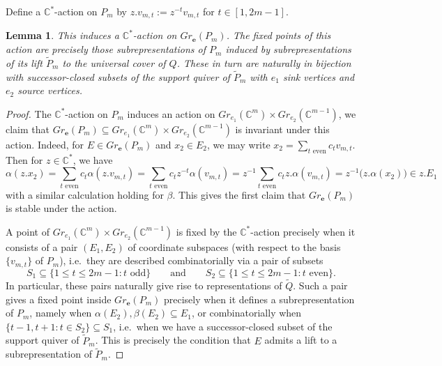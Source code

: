 \documentclass{amsart}
\newtheorem{lemma}[theorem]{Lemma}
\numberwithin{equation}{section}
\newcommand{\CC}{\mathbb{C}}
\newcommand{\bfe}{\mathbf{e}}
\begin{document}
    Define a $\CC^*$-action on $P_m$ by $z.v_{m,t}:=z^{-t}v_{m,t}$ for $t\in[1,2m-1]$.
    \begin{lemma}
      This induces a $\CC^*$-action on $Gr_\bfe(P_m)$.
      The fixed points of this action are precisely those subrepresentations of $P_m$ induced by subrepresentations of its lift $\widetilde P_m$ to the universal cover of $Q$.
      These in turn are naturally in bijection with successor-closed subsets of the support quiver of $\widetilde P_m$ with $e_1$ sink vertices and $e_2$ source vertices.
    \end{lemma}
    \begin{proof}
      The $\CC^*$-action on $P_m$ induces an action on $Gr_{e_1}(\CC^m)\times Gr_{e_2}(\CC^{m-1})$, we claim that $Gr_\bfe(P_m)\subseteq Gr_{e_1}(\CC^m)\times Gr_{e_2}(\CC^{m-1})$ is invariant under this action.
      Indeed, for $E\in Gr_\bfe(P_m)$ and $x_2\in E_2$, we may write $x_2=\sum\limits_{\text{$t$ even}} c_t v_{m,t}$.
      Then for $z\in\CC^*$, we have
      \[\alpha(z.x_2)=\sum\limits_{\text{$t$ even}} c_t \alpha(z.v_{m,t})=\sum\limits_{\text{$t$ even}} c_t z^{-t}\alpha(v_{m,t})=z^{-1}\sum\limits_{\text{$t$ even}} c_t z.\alpha(v_{m,t})=z^{-1} \big(z.\alpha(x_2)\big)\in z.E_1\]
      with a similar calculation holding for $\beta$.
      This gives the first claim that $Gr_\bfe(P_m)$ is stable under the action.

      A point of $Gr_{e_1}(\CC^m)\times Gr_{e_2}(\CC^{m-1})$ is fixed by the $\CC^*$-action precisely when it consists of a pair $(E_1,E_2)$ of coordinate subspaces (with respect to the basis $\{v_{m,t}\}$ of $P_m$), i.e.\ they are described combinatorially via a pair of subsets 
      \[S_1\subseteq\{1\le t\le 2m-1:\text{$t$ odd}\} \qquad \text{and} \qquad S_2\subseteq\{1\le t\le 2m-1:\text{$t$ even}\}.\]
      In particular, these pairs naturally give rise to representations of $\widetilde Q$.
      Such a pair gives a fixed point inside $Gr_\bfe(P_m)$ precisely when it defines a subrepresentation of $P_m$, namely when $\alpha(E_2),\beta(E_2)\subseteq E_1$, or combinatorially when $\{t-1,t+1:t\in S_2\}\subseteq S_1$, i.e.\ when we have a successor-closed subset of the support quiver of $\widetilde P_m$.
      This is precisely the condition that $E$ admits a lift to a subrepresentation of $\widetilde P_m$.
    \end{proof}
\end{document}
